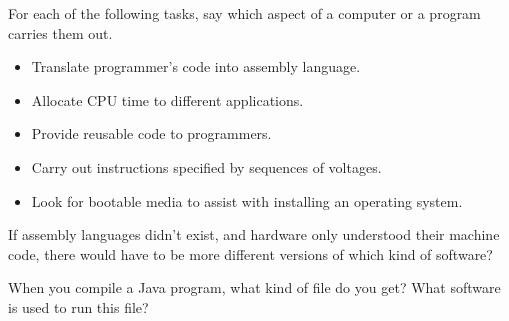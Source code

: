 \begin{exercise}
    For each of the following tasks, say which aspect of a computer or a program carries them out.
    \begin{itemize}
        \item Translate programmer's code into assembly language.
        \item Allocate CPU time to different applications.
        \item Provide reusable code to programmers.
        \item Carry out instructions specified by sequences of voltages.
        \item Look for bootable media to assist with installing an operating system.
    \end{itemize}
\end{exercise}

\begin{exercise}
    If assembly languages didn't exist, and hardware only understood their machine code, there would have to be more different versions of which kind of software?
\end{exercise}

\begin{exercise}
    When you compile a Java program, what kind of file do you get? What software is used to run this file?
\end{exercise}